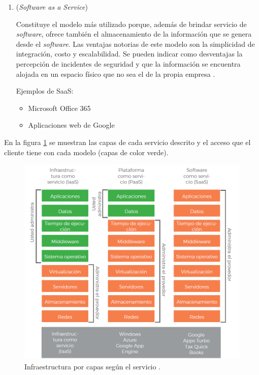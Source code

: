 \begin{enumerate}
\item {} (\emph{Software as a Service}) 

Constituye el modelo más utilizado porque, además de brindar servicio de \emph{software}, ofrece también el almacenamiento de la información que se genera desde el \emph{software}. Las ventajas notorias de este modelo son la simplicidad de integración, costo y escalabilidad. Se pueden indicar como desventajas la percepción de incidentes de seguridad y que la información se encuentra alojada en un espacio físico que no sea el de la propia empresa \citep{BOOK:2}. 

Ejemplos de SaaS:

\begin{itemize}
\item Microsoft Office 365
\item Aplicaciones web de Google
\end{itemize}

\vspace{0.5cm}

\end{enumerate}

En la figura \ref{fig:capas-servicios} se muestran las capas de cada servicio descrito y el acceso que el cliente tiene con cada modelo (capas de color verde).

\begin{figure}[htbp]
	\centering
	\includegraphics[width=.8\textwidth]{./Figures/capas-servicios.png}
	\caption{Infraestructura por capas según el servicio  \citep{BOOK:2}.}

	\label{fig:capas-servicios}
\end{figure}

